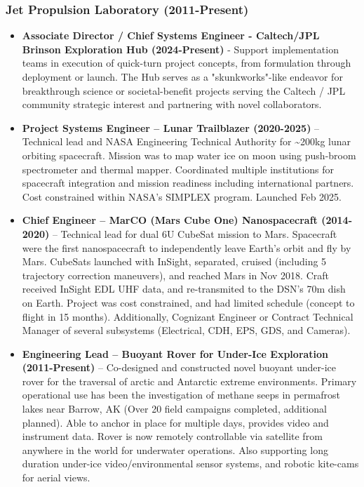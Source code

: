 \documentclass[11pt,letterpaper]{article}
\begin{document}
\subsubsection*{Jet Propulsion Laboratory (2011-Present)}
\begin{itemize}
\item \textbf{Associate Director / Chief Systems Engineer - Caltech/JPL Brinson Exploration Hub (2024-Present)} - Support implementation teams in execution of quick-turn project concepts, from formulation through deployment or launch. The Hub serves as a "skunkworks"-like endeavor for breakthrough science or societal-benefit projects serving the Caltech / JPL community strategic interest and partnering with novel collaborators.
\item \textbf{Project Systems Engineer – Lunar Trailblazer (2020-2025)} – Technical lead and NASA Engineering Technical Authority for \textasciitilde{}200kg lunar orbiting spacecraft. Mission was to map water ice on moon using push-broom spectrometer and thermal mapper. Coordinated multiple institutions for spacecraft integration and mission readiness including international partners. Cost constrained within NASA’s SIMPLEX program. Launched Feb 2025.
\item \textbf{Chief Engineer -- MarCO (Mars Cube One) Nanospacecraft (2014-2020)} – Technical lead for dual 6U CubeSat mission to Mars. Spacecraft were the first nanospacecraft to independently leave Earth’s orbit and fly by Mars. CubeSats launched with InSight, separated, cruised (including 5 trajectory correction maneuvers), and reached Mars in Nov 2018. Craft received InSight EDL UHF data, and re-transmited to the DSN’s 70m dish on Earth. Project was cost constrained, and had limited schedule (concept to flight in 15 months). Additionally, Cognizant Engineer or Contract Technical Manager of several subsystems (Electrical, CDH, EPS, GDS, and Cameras).
\item \textbf{Engineering Lead – Buoyant Rover for Under-Ice Exploration (2011-Present)} – Co-designed and constructed novel buoyant under-ice rover for the traversal of arctic and Antarctic extreme environments. Primary operational use has been the investigation of methane seeps in permafrost lakes near Barrow, AK (Over 20 field campaigns completed, additional planned). Able to anchor in place for multiple days, provides video and instrument data. Rover is now remotely controllable via satellite from anywhere in the world for underwater operations. Also supporting long duration under-ice video/environmental sensor systems, and robotic kite-cams for aerial views.

\end{itemize}
\end{document}
